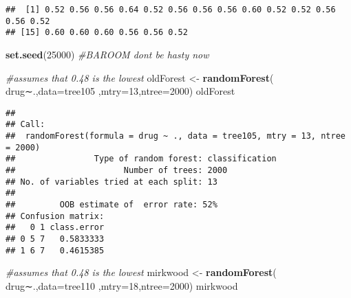 \documentclass[]{article}
\newenvironment{Shaded}{\begin{snugshade}}{\end{snugshade}}
\newcommand{\KeywordTok}[1]{\textcolor[rgb]{0.13,0.29,0.53}{\textbf{#1}}}
\newcommand{\DataTypeTok}[1]{\textcolor[rgb]{0.13,0.29,0.53}{#1}}
\newcommand{\DecValTok}[1]{\textcolor[rgb]{0.00,0.00,0.81}{#1}}
\newcommand{\StringTok}[1]{\textcolor[rgb]{0.31,0.60,0.02}{#1}}
\newcommand{\CommentTok}[1]{\textcolor[rgb]{0.56,0.35,0.01}{\textit{#1}}}
\newcommand{\ControlFlowTok}[1]{\textcolor[rgb]{0.13,0.29,0.53}{\textbf{#1}}}
\newcommand{\OperatorTok}[1]{\textcolor[rgb]{0.81,0.36,0.00}{\textbf{#1}}}
\newcommand{\NormalTok}[1]{#1}
\begin{document}
\begin{Shaded}
\end{Shaded}

\begin{verbatim}
##  [1] 0.52 0.56 0.56 0.64 0.52 0.56 0.56 0.56 0.60 0.52 0.52 0.56 0.56 0.52
## [15] 0.60 0.60 0.60 0.56 0.56 0.52
\end{verbatim}

\begin{Shaded}
\begin{Highlighting}[]
\KeywordTok{set.seed}\NormalTok{(}\DecValTok{25000}\NormalTok{)}
\CommentTok{#BAROOM dont be hasty now}

\CommentTok{#assumes that 0.48 is the lowest}
\NormalTok{oldForest <-}\StringTok{ }\KeywordTok{randomForest}\NormalTok{( drug∼.,}\DataTypeTok{data=}\NormalTok{tree105  ,}\DataTypeTok{mtry=}\DecValTok{13}\NormalTok{,}\DataTypeTok{ntree=}\DecValTok{2000}\NormalTok{)}
\NormalTok{oldForest}
\end{Highlighting}
\end{Shaded}

\begin{verbatim}
## 
## Call:
##  randomForest(formula = drug ~ ., data = tree105, mtry = 13, ntree = 2000) 
##                Type of random forest: classification
##                      Number of trees: 2000
## No. of variables tried at each split: 13
## 
##         OOB estimate of  error rate: 52%
## Confusion matrix:
##   0 1 class.error
## 0 5 7   0.5833333
## 1 6 7   0.4615385
\end{verbatim}

\begin{Shaded}
\begin{Highlighting}[]
\CommentTok{#assumes that 0.48 is the lowest}
\NormalTok{mirkwood <-}\StringTok{ }\KeywordTok{randomForest}\NormalTok{( drug∼.,}\DataTypeTok{data=}\NormalTok{tree110  ,}\DataTypeTok{mtry=}\DecValTok{18}\NormalTok{,}\DataTypeTok{ntree=}\DecValTok{2000}\NormalTok{)}
\NormalTok{mirkwood}
\end{Highlighting}
\end{Shaded}
\end{document}

